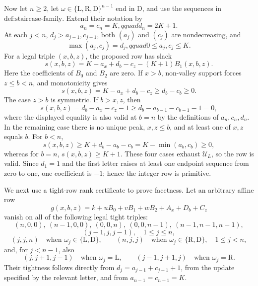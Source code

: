Now let \(n\ge2\), let \(\omega\in\{\mathrm L,\mathrm R,\mathrm D\}^{n-1}\) end in \(\mathrm D\), and use the sequences in \(\text{def:staircase-family}\).  Extend their notation by
\[
 a_n=c_n=K,qquad d_n=2K+1.
\]
At each \(j<n\), \(d_j>a_{j-1},c_{j-1}\), both \((a_j)\) and \((c_j)\) are nondecreasing, and
\[
 \max(a_j,c_j)=d_j,qquad 0\le a_j,c_j\le K.
\]
For a legal triple \((x,b,z)\), the proposed row has slack
\[
 s(x,b,z)=K-a_x+d_b-c_z-(K+1)B_1(x,b,z).
\]
Here the coefficients of \(B_0\) and \(B_2\) are zero.  If \(x>b\), non-valley support forces \(z\le b<n\), and monotonicity gives
\[
 s(x,b,z)=K-a_x+d_b-c_z\ge d_b-c_b\ge0.
\]
The case \(z>b\) is symmetric.  If \(b>x,z\), then
\[
 s(x,b,z)=d_b-a_x-c_z-1
 \ge d_b-a_{b-1}-c_{b-1}-1=0,
\]
where the displayed equality is also valid at \(b=n\) by the definitions of \(a_n,c_n,d_n\).  In the remaining case there is no unique peak, \(x,z\le b\), and at least one of \(x,z\) equals \(b\).  For \(b<n\),
\[
 s(x,b,z)\ge K+d_b-a_b-c_b=K-\min(a_b,c_b)\ge0,
\]
whereas for \(b=n\), \(s(x,b,z)\ge K+1\).  These four cases exhaust \(\mathcal U_L\), so the row is valid.  Since \(d_1=1\) and the first letter raises at least one endpoint sequence from zero to one, one coefficient is \(-1\); hence the integer row is primitive.

We next use a tight-row rank certificate to prove facetness.  Let an arbitrary affine row
\[
 g(x,b,z)=k+uB_0+vB_1+wB_2+A_x+D_b+C_z
\]
vanish on all of the following legal tight triples:
\[
 (n,0,0),\ (n-1,0,0),\ (0,0,n),\ (0,0,n-1),\ (n-1,n-1,n-1),
\]
\[
 (j-1,j,j-1),\quad 1\le j\le n,
\]
\[
 (j,j,n)\quad\text{when }\omega_j\in\{\mathrm L,\mathrm D\},
 \qquad
 (n,j,j)\quad\text{when }\omega_j\in\{\mathrm R,\mathrm D\},
 \quad 1\le j<n,
\]
and, for \(j<n-1\), also
\[
 (j,j+1,j-1)\quad\text{when }\omega_j=\mathrm L,
 \qquad
 (j-1,j+1,j)\quad\text{when }\omega_j=\mathrm R.
\]
Their tightness follows directly from \(d_j=a_{j-1}+c_{j-1}+1\), from the update specified by the relevant letter, and from \(a_{n-1}=c_{n-1}=K\).

